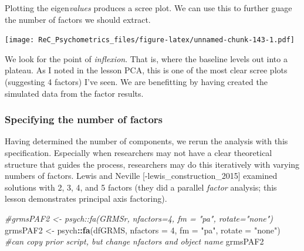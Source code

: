\documentclass[
  english,
]{book}
\newenvironment{Shaded}{\begin{snugshade}}{\end{snugshade}}
\newcommand{\CommentTok}[1]{\textcolor[rgb]{0.56,0.35,0.01}{\textit{#1}}}
\newcommand{\DataTypeTok}[1]{\textcolor[rgb]{0.13,0.29,0.53}{#1}}
\newcommand{\DecValTok}[1]{\textcolor[rgb]{0.00,0.00,0.81}{#1}}
\newcommand{\KeywordTok}[1]{\textcolor[rgb]{0.13,0.29,0.53}{\textbf{#1}}}
\newcommand{\NormalTok}[1]{#1}
\newcommand{\OperatorTok}[1]{\textcolor[rgb]{0.81,0.36,0.00}{\textbf{#1}}}
\newcommand{\StringTok}[1]{\textcolor[rgb]{0.31,0.60,0.02}{#1}}
\begin{document}
Plotting the eigen\emph{values} produces a scree plot. We can use this to further guage the number of factors we should extract.

\begin{Shaded}
\end{Shaded}

\texttt{[image: ReC\_Psychometrics\_files/figure-latex/unnamed-chunk-143-1.pdf]}

We look for the point of \emph{inflexion}. That is, where the baseline levels out into a plateau. As I noted in the lesson PCA, this is one of the most clear scree plots (suggesting 4 factors) I've seen. We are benefitting by having created the simulated data from the factor results.

\hypertarget{specifying-the-number-of-factors}{%
\subsubsection{Specifying the number of factors}\label{specifying-the-number-of-factors}}

Having determined the number of components, we rerun the analysis with this specification. Especially when researchers may not have a clear theoretical structure that guides the process, researchers may do this iteratively with varying numbers of factors. Lewis and Neville {[}-lewis\_construction\_2015{]} examined solutions with 2, 3, 4, and 5 factors (they did a parallel \emph{factor} analysis; this lesson demonstrates principal axis factoring).

\begin{Shaded}
\begin{Highlighting}[]
\CommentTok{#grmsPAF2 <- psych::fa(GRMSr, nfactors=4, fm = "pa", rotate="none")}
\NormalTok{grmsPAF2 <-}\StringTok{ }\NormalTok{psych}\OperatorTok{::}\KeywordTok{fa}\NormalTok{(dfGRMS, }\DataTypeTok{nfactors =} \DecValTok{4}\NormalTok{, }\DataTypeTok{fm =} \StringTok{"pa"}\NormalTok{, }\DataTypeTok{rotate =} \StringTok{"none"}\NormalTok{) }\CommentTok{#can copy prior script, but change nfactors and object name}
\NormalTok{grmsPAF2}
\end{Highlighting}
\end{Shaded}
\end{document}
